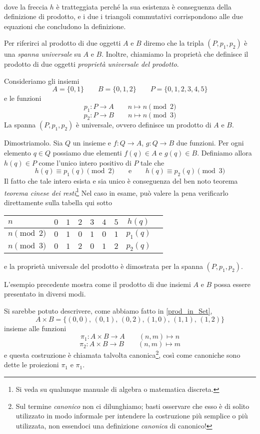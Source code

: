 %
\\[2ex]
dove la freccia \(h\) è tratteggiata perché la sua esistenza è conseguenza della definizione di prodotto, e i due i triangoli commutativi corrispondono alle due equazioni che concludono la definizione.

\medskip
Per riferirci al prodotto di due oggetti \(A\) e \(B\) diremo che la tripla \((P,p_1,p_2)\) è una \emph{spanna universale} su  \(A\) e \(B\). Inoltre, chiamiamo la proprietà che definisce il prodotto di due oggetti \emph{proprietà universale del prodotto}.

\begin{example}\label{esempio_spanna_universale_in_Set}
	Consideriamo gli insiemi
	\[
		A=\{0,1\}\qquad B=\{0,1,2\}\qquad P=\{0,1,2,3,4,5\}
	\]
	e le funzioni
	\[
		p_1\colon P\to A\qquad n\mapsto n\pmod 2
	\]
	\[
		p_2\colon P\to B\qquad n\mapsto n\pmod 3
	\]
	La spanna \((P, p_1, p_2)\) è universale, ovvero definisce un prodotto di \(A\) e \(B\).


Dimostriamolo. Sia \(Q\) un insieme e \(f\colon Q\to A\), \(g\colon Q\to B\) due funzioni. Per ogni elemento \(q\in Q\) possiamo due elementi \(f(q)\in A\) e \(g(q)\in B\). Definiamo allora \(h(q)\in P\) come l'unico intero positivo di \(P\) tale che 
\[
h(q)\equiv p_1(q) \pmod 2\qquad\text{e}\qquad h(q)\equiv p_2(q) \pmod 3
\]
Il fatto che tale intero esista e sia unico è conseguenza del ben noto teorema \emph{teorema cinese dei resti}\footnote{Si veda su qualunque manuale di algebra o matematica discreta.} Nel caso in esame, può valere la pena verificarlo direttamente sulla tabella qui sotto
\begin{center}
\begin{tabular}{|l|c|c|c|c|c|c|c|c|}
\hline
\(n\) & \(0\) & \(1\) & \(2\) & \(3\) & \(4\) & \(5\)& \(h(q)\) \\
\hline
\(n \pmod 2\) & \(0\) & \(1\) & \(0\) & \(1\) & \(0\) & \(1\) & \(p_1(q)\)\\
\hline
\(n \pmod 3\)  & \(0\)  & \(1\) & \(2\) & \(0\) & \(1\) & \(2\) & \(p_2(q)\)\\
\hline
\end{tabular} 	
\end{center}
e la proprietà universale del prodotto è dimostrata per la spanna \((P, p_1, p_2)\).
\end{example}
L'esempio precedente mostra come il prodotto di due insiemi \(A\) e \(B\) possa essere presentato in diversi modi.

Si sarebbe potuto descrivere, come abbiamo fatto  in \ref{prod_in_Set},
\[
	A\times B=\{(0,0),\,(0,1),\,(0,2),(1,0),\,(1,1),\,(1,2)\}
\]
insieme alle funzioni
\[
	\pi_1\colon A\times B\to A\qquad (n,m)\mapsto n
\]
\[
	\pi_2 \colon A\times B\to B\qquad (n,m)\mapsto m
\]
e questa costruzione è chiamata talvolta canonica\footnote{Sul termine \emph{canonico} non ci dilunghiamo; basti osservare che esso è di solito utilizzato in modo informale per intendere la costruzione più semplice o più utilizzata, non essendoci una definizione \emph{canonica} di canonico!}, così come canoniche sono dette le proiezioni \(\pi_1\) e \(\pi_1\).

